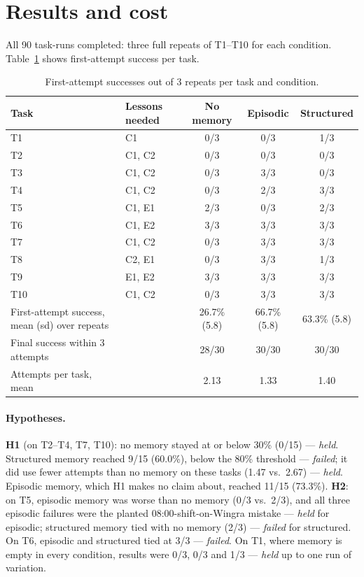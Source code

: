 
\section{Results and cost}

All 90 task-runs completed: three full repeats of T1--T10 for each condition.
Table~\ref{tab:first-try} shows first-attempt success per task.

\begin{table}[h]
\centering
\small
\begin{tabular}{llccc}
\toprule
Task & Lessons needed & No memory & Episodic & Structured \\
\midrule
T1  & C1      & 0/3 & 0/3 & 1/3 \\
T2  & C1, C2  & 0/3 & 0/3 & 0/3 \\
T3  & C1, C2  & 0/3 & 3/3 & 0/3 \\
T4  & C1, C2  & 0/3 & 2/3 & 3/3 \\
T5  & C1, E1  & 2/3 & 0/3 & 2/3 \\
T6  & C1, E2  & 3/3 & 3/3 & 3/3 \\
T7  & C1, C2  & 0/3 & 3/3 & 3/3 \\
T8  & C2, E1  & 0/3 & 3/3 & 1/3 \\
T9  & E1, E2  & 3/3 & 3/3 & 3/3 \\
T10 & C1, C2  & 0/3 & 3/3 & 3/3 \\
\midrule
First-attempt success, mean (sd) over repeats & & 26.7\% (5.8) & 66.7\% (5.8) & 63.3\% (5.8) \\
Final success within 3 attempts & & 28/30 & 30/30 & 30/30 \\
Attempts per task, mean & & 2.13 & 1.33 & 1.40 \\
\bottomrule
\end{tabular}
\caption{First-attempt successes out of 3 repeats per task and condition.}
\label{tab:first-try}
\end{table}

\paragraph{Hypotheses.}
\textbf{H1} (on T2--T4, T7, T10): no memory stayed at or below 30\% (0/15) --- \emph{held}.
Structured memory reached 9/15 (60.0\%), below the 80\% threshold --- \emph{failed}; it did
use fewer attempts than no memory on these tasks (1.47 vs.\ 2.67) --- \emph{held}. Episodic
memory, which H1 makes no claim about, reached 11/15 (73.3\%).
\textbf{H2}: on T5, episodic memory was worse than no memory (0/3 vs.\ 2/3), and all three
episodic failures were the planted 08:00-shift-on-Wingra mistake --- \emph{held} for episodic;
structured memory tied with no memory (2/3) --- \emph{failed} for structured. On T6, episodic
and structured tied at 3/3 --- \emph{failed}. On T1, where memory is empty in every condition,
results were 0/3, 0/3 and 1/3 --- \emph{held} up to one run of variation.

